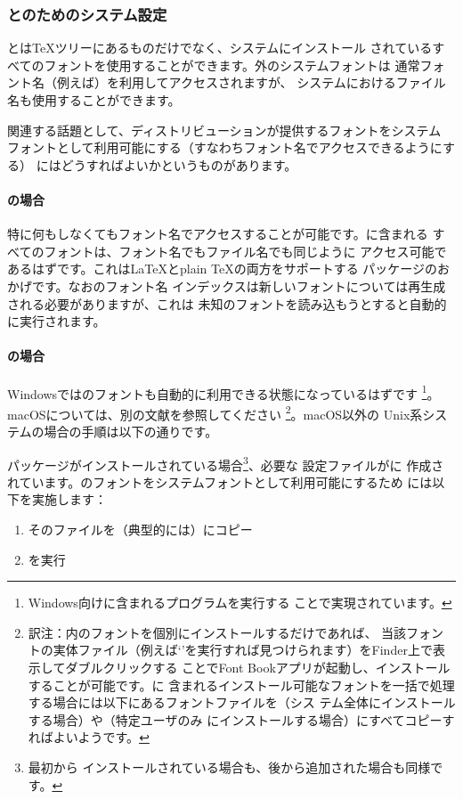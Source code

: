 \documentclass[uplatex,dvipdfmx,12pt]{jsarticle}
\begin{document}
\subsubsection{\XeTeX と\LuaTeX のためのシステム設定}
\label{sec:font-conf-sys}

\XeTeX と\LuaTeX は\TeX ツリーにあるものだけでなく、システムにインストール
されているすべてのフォントを使用することができます。\TL 外のシステムフォントは
通常フォント名（例えば）を利用してアクセスされますが、
システムにおけるファイル名も使用することができます。

関連する話題として、\TL ディストリビューションが提供するフォントをシステム
フォントとして利用可能にする（すなわちフォント名でアクセスできるようにする）
にはどうすればよいかというものがあります。

\paragraph{\LuaTeX の場合}
特に何もしなくてもフォント名でアクセスすることが可能です。\TL に含まれる
すべてのフォントは、フォント名でもファイル名でも同じように
アクセス可能であるはずです。これは\LaTeX とplain \TeX の両方をサポートする
パッケージのおかげです。なおのフォント名
インデックスは新しいフォントについては再生成される必要がありますが、これは
未知のフォントを読み込もうとすると自動的に実行されます。

\paragraph{\XeTeX の場合}
Windowsでは\TL のフォントも自動的に利用できる状態になっているはずです
\footnote{Windows向け\TL に含まれるプログラムを実行する
ことで実現されています。}。macOSについては、別の文献を参照してください
\footnote{訳注：\TL 内のフォントを個別にインストールするだけであれば、
当該フォントの実体ファイル（例えば`'を実行すれば見つけられます）をFinder上で表示してダブルクリックする
ことでFont Bookアプリが起動し、インストールすることが可能です。\TL に
含まれるインストール可能なフォントを一括で処理する場合には以下にあるフォントファイルを（シス
テム全体にインストールする場合）や（特定ユーザのみ
にインストールする場合）にすべてコピーすればよいようです。}。macOS以外の
Unix系システムの場合の手順は以下の通りです。

パッケージがインストールされている場合\footnote{最初から
インストールされている場合も、後から追加された場合も同様です。}、必要な
設定ファイルがに
作成されています。\TL のフォントをシステムフォントとして利用可能にするため
には以下を実施します：
%
\begin{enumerate}
\item そのファイルを（典型的には）にコピー
\item {}を実行
\end{enumerate}
\end{document}
